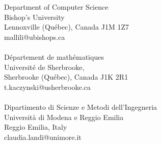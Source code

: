 \documentclass[12pt]{article}
\begin{document}



\medskip



\noindent Department of Computer Science\\
Bishop's University\\
Lennoxville (Qu\'ebec),  Canada J1M 1Z7\\
mallili@ubishops.ca
\\~\\
D\'epartement de math\'ematiques\\
Universit\'e de Sherbrooke,\\
Sherbrooke (Qu\'ebec), Canada J1K 2R1\\
t.kaczynski@usherbrooke.ca
\\~\\
\noindent Dipartimento di Scienze e Metodi dell'Ingegneria\\
Universit\`a di Modena e Reggio Emilia\\
Reggio Emilia, Italy
\\
claudia.landi@unimore.it
\end{document}
